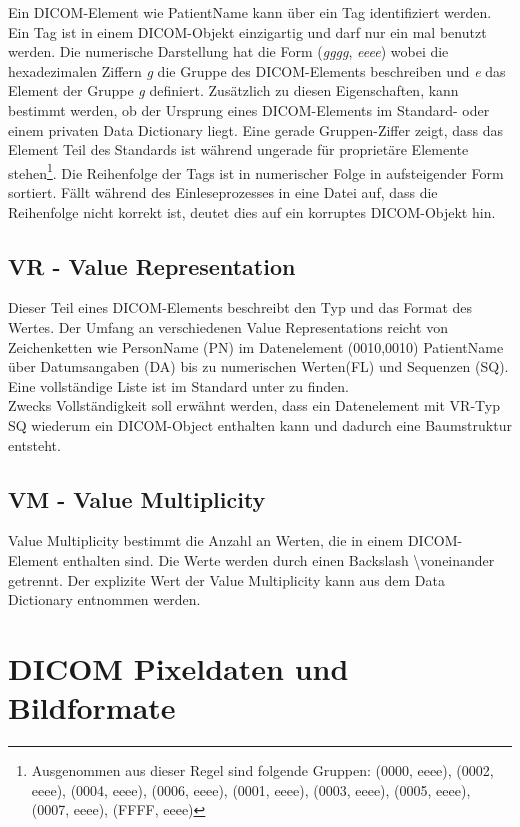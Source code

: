 Ein DICOM-Element wie PatientName kann über ein Tag identifiziert werden. Ein Tag ist in einem DICOM-Objekt einzigartig und darf nur ein mal benutzt werden. Die numerische Darstellung hat die Form (\textit{gggg}, \textit{eeee}) wobei die hexadezimalen Ziffern \textit{g} die Gruppe des DICOM-Elements beschreiben und \textit{e} das Element der Gruppe \textit{g} definiert. Zusätzlich zu diesen Eigenschaften, kann bestimmt werden, ob der Ursprung eines DICOM-Elements im Standard- oder einem privaten Data Dictionary liegt. Eine gerade Gruppen-Ziffer zeigt, dass das Element Teil des Standards ist während ungerade für proprietäre Elemente stehen\footnote{Ausgenommen aus dieser Regel sind folgende Gruppen: (0000, eeee), (0002, eeee), (0004, eeee), (0006, eeee), (0001, eeee), (0003, eeee), (0005, eeee), (0007, eeee), (FFFF, eeee)}\cite[7.1]{dicom:structure}. Die Reihenfolge der Tags ist in numerischer Folge in aufsteigender Form sortiert. Fällt während des Einleseprozesses in eine Datei auf, dass die Reihenfolge nicht korrekt ist, deutet dies auf ein korruptes DICOM-Objekt hin.\\

\subsection{VR - Value Representation}
Dieser Teil eines DICOM-Elements beschreibt den Typ und das Format des Wertes\cite[6.2]{dicom:structure}. Der Umfang an verschiedenen Value Representations reicht von Zeichenketten wie PersonName (PN) im Datenelement (0010,0010) PatientName über Datumsangaben (DA) bis zu numerischen Werten(FL) und Sequenzen (SQ). Eine vollständige Liste ist im Standard unter \cite[Table 6.2.1]{dicom:structure} zu finden.\\
Zwecks Vollständigkeit soll erwähnt werden, dass ein Datenelement mit VR-Typ SQ wiederum ein DICOM-Object enthalten kann und dadurch eine Baumstruktur entsteht.

\subsection{VM - Value Multiplicity}
Value Multiplicity bestimmt die Anzahl an Werten, die in einem DICOM-Element enthalten sind. Die Werte werden durch einen Backslash \textbackslash voneinander getrennt. Der explizite Wert der Value Multiplicity kann aus dem Data Dictionary entnommen werden.\cite[6.4]{dicom:structure}

\section{DICOM Pixeldaten und Bildformate}

